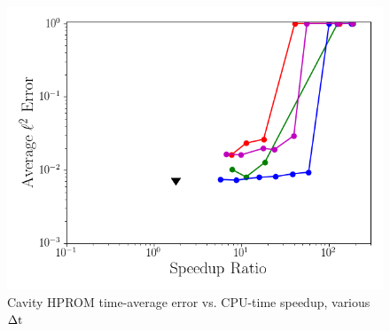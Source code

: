 \begin{figure}
	\centering
	\begin{minipage}{0.49\linewidth}
		\includegraphics[width=0.99\linewidth]{Chapters/CavityAndCVRC/Images/cavity/deim/sampled_dt1e-5_Average_errorRaw_pareto.png}
		\subcaption{$\dt = 10 \times \dtFOM$}
	\end{minipage}
	\caption{\label{fig:cavitySampledROMErrVsTime}Cavity HPROM time-average error vs. CPU-time speedup, various $\Delta \text{t}$}
\end{figure}

